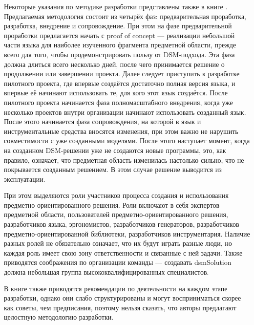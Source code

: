 Некоторые указания по методике разработки представлены также в книге \cite{kelly2008domain}. 
Предлагаемая методология состоит из четырёх фаз: предварительная проработка, разработка, 
внедрение и сопровождение. При этом на фазе предварительной проработки предлагается начать с
proof of concept --- реализации небольшой части языка для наиболее изученного фрагмента 
предметной области, прежде всего для того, чтобы продемонстрировать пользу от \ac{DSM}-подхода. 
Эта фаза должна длиться всего несколько дней, после чего принимается решение о продолжении 
или завершении проекта. Далее следует приступить к разработке пилотного проекта, где 
впервые создаётся достаточно полная версия языка, и впервые её начинают использовать 
те, для кого этот язык создаётся. После пилотного проекта начинается фаза полномасштабного 
внедрения, когда уже несколько проектов внутри организации начинают использовать созданный 
язык. После этого начинается фаза сопровождения, на которой в язык и инструментальные 
средства вносятся изменения, при этом важно не нарушить совместимости с уже созданными 
моделями. После этого наступает момент, когда на созданном \ac{DSM}-решении уже не создаются 
новые программы, это, как правило, означает, что предметная область изменилась настолько 
сильно, что не покрывается созданным решением. В этом случае решение выводится из эксплуатации.

При этом выделяются роли участников процесса создания и использования предметно-ориентированного 
решения. Роли включают в себя экспертов предметной области, пользователей предметно-ориентированного 
решения, разработчиков языка, эргономистов, разработчиков генераторов, разработчиков 
предметно-ориентированной библиотеки, разработчиков инструментария. Наличие разных 
ролей не обязательно означает, что их будут играть разные люди, но каждая роль имеет свою зону 
ответственности и связанные с ней задачи. Также приводятся соображения по организации команды 
--- создавать \ac{dsmSolution} должна небольшая группа высококвалифицированных специалистов.

В книге также приводятся рекомендации по деятельности на каждом этапе разработки, однако 
они слабо структурированы и могут восприниматься скорее как советы, чем предписания, 
поэтому нельзя сказать, что авторы предлагают целостную методологию разработки.

